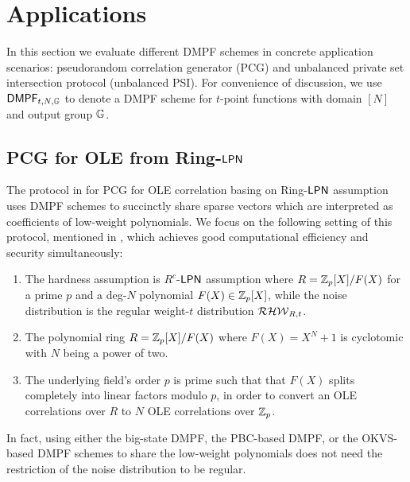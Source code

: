 \section{Applications}\label{sec:applications}
In this section we evaluate different DMPF schemes in concrete application scenarios: pseudorandom correlation generator (PCG) and unbalanced private set intersection protocol (unbalanced PSI). For convenience of discussion, we use ${\sf DMPF}_{t, N, \mathbb{G}}$ to denote a DMPF scheme for $t$-point functions with domain $[N]$ and output group $\mathbb{G}$. 

\subsection{PCG for OLE from Ring-${\sf LPN}$}
The protocol in \cite{cryptoeprint:2022/1035} for PCG for OLE correlation basing on Ring-${\sf LPN}$ assumption uses DMPF schemes to succinctly share sparse vectors which are interpreted as coefficients of low-weight polynomials. We focus on the following setting of this protocol, mentioned in , which achieves good computational efficiency and security simultaneously: 
\begin{enumerate}
    \item The hardness assumption is $R^c$-${\sf LPN}$ assumption where $R = \mathbb{Z}_p[X]/F(X)$ for a prime $p$ and a deg-$N$ polynomial $F(X)\in\mathbb{Z}_p[X]$, while the noise distribution is the regular weight-$t$ distribution $\mathcal{RHW}_{R,t}$. 
    \item The polynomial ring $R = \mathbb{Z}_p[X]/F(X)$ where $F(X) = X^N+1$ is cyclotomic with $N$ being a power of two. 
    \item The underlying field's order $p$ is prime such that that $F(X)$ splits completely into linear factors modulo $p$, in order to convert an OLE correlations over $R$ to $N$ OLE correlations over $\mathbb{Z}_p$. 
\end{enumerate}
\begin{remark}
    In fact, using either the big-state DMPF, the PBC-based DMPF, or the OKVS-based DMPF schemes to share the low-weight polynomials does not need the restriction of the noise distribution to be regular. 
\end{remark}

